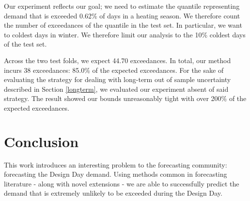 \documentclass{article}
\begin{document}
Our experiment reflects our goal; we need to estimate the quantile representing demand that is exceeded 0.62\% of days in a heating season. We therefore count the number of exceedances of the quantile in the test set. In particular, we want to coldest days in winter. We therefore limit our analysis to the 10\% coldest days of the test set.

 Across the two test folds, we expect 44.70 exceedances. In total, our method incurs 38 exceedances: 85.0\% of the expected exceedances. For the sake of evaluating the strategy for dealing with long-term out of sample uncertainty described in Section \ref{longterm}, we evaluated our experiment absent of said strategy. The result showed our bounds unreasonably tight with over 200\% of the expected exceedances.

\section{Conclusion}

This work introduces an interesting problem to the forecasting community: forecasting the Design Day demand. Using methods common in forecasting literature - along with novel extensions - we are able to successfully predict the demand that is extremely unlikely to be exceeded during the Design Day. 





\end{document}
